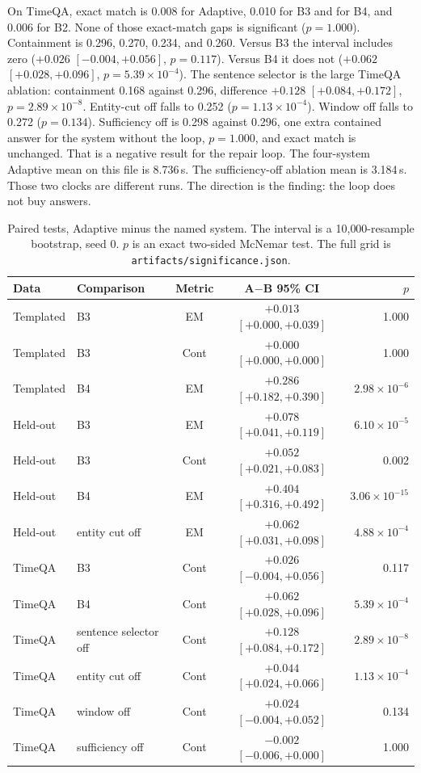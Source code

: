 \documentclass[sigconf,anonymous,review]{acmart}
\begin{document}
On TimeQA, exact match is 0.008 for Adaptive, 0.010 for B3 and for B4, and 0.006 for B2.
None of those exact-match gaps is significant ($p=1.000$).
Containment is 0.296, 0.270, 0.234, and 0.260.
Versus B3 the interval includes zero ($+0.026$ $[-0.004,+0.056]$, $p=0.117$).
Versus B4 it does not ($+0.062$ $[+0.028,+0.096]$, $p=5.39\times 10^{-4}$).
The sentence selector is the large TimeQA ablation: containment 0.168 against 0.296, difference $+0.128$ $[+0.084,+0.172]$, $p=2.89\times 10^{-8}$.
Entity-cut off falls to 0.252 ($p=1.13\times 10^{-4}$).
Window off falls to 0.272 ($p=0.134$).
Sufficiency off is 0.298 against 0.296, one extra contained answer for the system without the loop, $p=1.000$, and exact match is unchanged.
That is a negative result for the repair loop.
The four-system Adaptive mean on this file is 8.736\,s.
The sufficiency-off ablation mean is 3.184\,s.
Those two clocks are different runs.
The direction is the finding: the loop does not buy answers.

\begin{table}[t]
\caption{Paired tests, Adaptive minus the named system.
The interval is a 10{,}000-resample bootstrap, seed 0.
$p$ is an exact two-sided McNemar test.
The full grid is \texttt{artifacts/significance.json}.}
\label{tab:sig}
\begin{tabular}{llccr}
\toprule
Data & Comparison & Metric & A$-$B 95\% CI & $p$ \\
\midrule
Templated & B3 & EM & $+0.013$ $[+0.000,+0.039]$ & 1.000 \\
Templated & B3 & Cont & $+0.000$ $[+0.000,+0.000]$ & 1.000 \\
Templated & B4 & EM & $+0.286$ $[+0.182,+0.390]$ & $2.98\times 10^{-6}$ \\
Held-out & B3 & EM & $+0.078$ $[+0.041,+0.119]$ & $6.10\times 10^{-5}$ \\
Held-out & B3 & Cont & $+0.052$ $[+0.021,+0.083]$ & 0.002 \\
Held-out & B4 & EM & $+0.404$ $[+0.316,+0.492]$ & $3.06\times 10^{-15}$ \\
Held-out & entity cut off & EM & $+0.062$ $[+0.031,+0.098]$ & $4.88\times 10^{-4}$ \\
TimeQA & B3 & Cont & $+0.026$ $[-0.004,+0.056]$ & 0.117 \\
TimeQA & B4 & Cont & $+0.062$ $[+0.028,+0.096]$ & $5.39\times 10^{-4}$ \\
TimeQA & sentence selector off & Cont & $+0.128$ $[+0.084,+0.172]$ & $2.89\times 10^{-8}$ \\
TimeQA & entity cut off & Cont & $+0.044$ $[+0.024,+0.066]$ & $1.13\times 10^{-4}$ \\
TimeQA & window off & Cont & $+0.024$ $[-0.004,+0.052]$ & 0.134 \\
TimeQA & sufficiency off & Cont & $-0.002$ $[-0.006,+0.000]$ & 1.000 \\
\bottomrule
\end{tabular}
\end{table}
\end{document}
